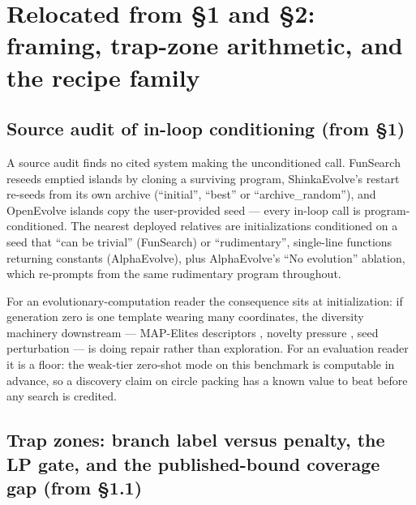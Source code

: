 
\section{Relocated from \S1 and \S2: framing, trap-zone arithmetic, and the recipe family}

\subsection{Source audit of in-loop conditioning (from \S1)}

A source audit finds no cited system making the unconditioned call. FunSearch reseeds emptied
islands by cloning a surviving program, ShinkaEvolve's restart re-seeds from its own archive
(``initial'', ``best'' or ``archive\_random''), and OpenEvolve islands copy the user-provided seed
--- every in-loop call is program-conditioned. The nearest deployed relatives are initializations
conditioned on a seed that ``can be trivial'' (FunSearch) or ``rudimentary'', single-line functions
returning constants (AlphaEvolve), plus AlphaEvolve's ``No evolution'' ablation, which re-prompts
from the same rudimentary program throughout.

For an evolutionary-computation reader the consequence sits at initialization: if generation zero
is one template wearing many coordinates, the diversity machinery downstream --- MAP-Elites
descriptors \citep{mouret2015mapelites}, novelty pressure \citep{lehman2011novelty}, seed
perturbation --- is doing repair rather than exploration. For an evaluation reader it is a floor:
the weak-tier zero-shot mode on this benchmark is computable in advance, so a discovery claim on
circle packing has a known value to beat before any search is credited.

\subsection{Trap zones: branch label versus penalty, the LP gate, and the published-bound coverage gap (from \S1.1)}

